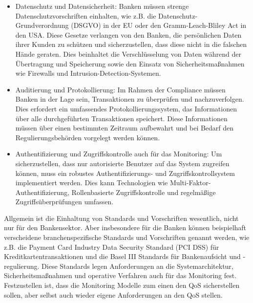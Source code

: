 \begin{itemize}
\item Datenschutz und Datensicherheit: Banken müssen strenge Datenschutzvorschriften einhalten, wie z.B. die Datenschutz-Grundverordnung (DSGVO) in der EU oder den Gramm-Leach-Bliley Act in den USA. Diese Gesetze verlangen von den Banken, die persönlichen Daten ihrer Kunden zu schützen und sicherzustellen, dass diese nicht in die falschen Hände geraten. Dies beinhaltet die Verschlüsselung von Daten während der Übertragung und Speicherung sowie den Einsatz von Sicherheitsmaßnahmen wie Firewalls und Intrusion-Detection-Systemen.
\item Auditierung und Protokollierung: Im Rahmen der Compliance müssen Banken in der Lage sein, Transaktionen zu überprüfen und nachzuverfolgen. Dies erfordert ein umfassendes Protokollierungssystem, das Informationen über alle durchgeführten Transaktionen speichert. Diese Informationen müssen über einen bestimmten Zeitraum aufbewahrt und bei Bedarf den Regulierungsbehörden vorgelegt werden können.
\item Authentifizierung und Zugriffskontrolle auch für das Monitoring: Um sicherzustellen, dass nur autorisierte Benutzer auf das System zugreifen können, muss ein robustes Authentifizierungs- und Zugriffskontrollsystem implementiert werden. Dies kann Technologien wie Multi-Faktor-Authentifizierung, Rollenbasierte Zugriffskontrolle und regelmäßige Zugriffsüberprüfungen umfassen.
\end{itemize}
Allgemein ist die Einhaltung von Standards und Vorschriften wesentlich, nicht nur für den Bankensektor. Aber insbesondere für die Banken können beispielhaft verscheidene branchenspezifische Standards und Vorschriften genannt werden, wie z.B. die Payment Card Industry Data Security Standard (PCI DSS) für Kreditkartentransaktionen und die Basel III Standards für Bankenaufsicht und -regulierung. Diese Standards legen Anforderungen an die Systemarchitektur, Sicherheitsmaßnahmen und operative Verfahren auch für das Monitoring fest. 
Festzustellen ist, dass die Monitoring Modelle zum einen den QoS sicherstellen sollen, aber selbst auch wieder eigene Anforderungen an den QoS stellen. 

